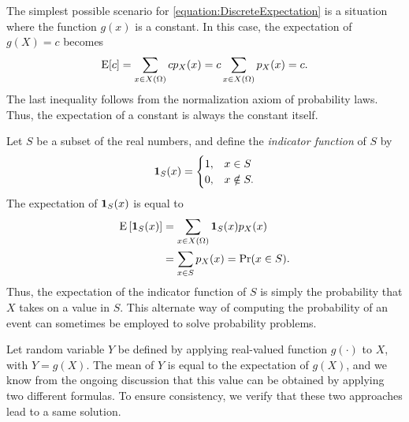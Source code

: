 \begin{example}
The simplest possible scenario for \eqref{equation:DiscreteExpectation} is a situation where the function $g(x)$ is a constant.
In this case, the expectation of $g(X) = c$ becomes
\begin{equation*}
\mathrm{E} [ c ]
= \sum_{x \in X(\Omega)} c p_X (x)
= c \sum_{x \in X(\Omega)} p_X (x)
= c .
\end{equation*}
The last inequality follows from the normalization axiom of probability laws.
Thus, the expectation of a constant is always the constant itself.
\end{example}

\begin{example}
Let $S$ be a subset of the real numbers, and define the \emph{indicator function} of $S$ by 
\begin{equation*}
\mathbf{1}_S (x) = \begin{cases} 1, & x \in S\\
0, & x \notin S . \end{cases}
\end{equation*}
The expectation of $\mathbf{1}_S (x)$ is equal to
\begin{equation*}
\begin{split}
\mathrm{E} \left[ \mathbf{1}_S (x) \right]
&= \sum_{x \in X(\Omega)} \mathbf{1}_S (x) p_X(x) \\
&= \sum_{x \in S} p_X(x)
= \Pr (x \in S) .
\end{split}
\end{equation*}
Thus, the expectation of the indicator function of $S$ is simply the probability that $X$ takes on a value in $S$.
This alternate way of computing the probability of an event can sometimes be employed to solve probability problems.
\end{example}

Let random variable $Y$ be defined by applying real-valued function $g(\cdot)$ to $X$, with $Y = g(X)$.
The mean of $Y$ is equal to the expectation of $g(X)$, and we know from the ongoing discussion that this value can be obtained by applying two different formulas.
To ensure consistency, we verify that these two approaches lead to a same solution.

